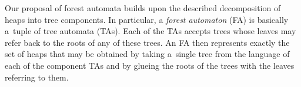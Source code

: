 Our proposal of forest automata builds upon the described decomposition of heaps
into tree components. In particular, a \emph{forest automaton} (FA) is basically
a~tuple of tree automata (TAs). Each of the TAs accepts trees whose
leaves may refer back to the roots of any of these trees. An FA then represents
exactly the set of heaps that may be obtained by taking a~single tree from the
language of each of the component TAs and by glueing the roots of the trees with
the leaves referring to them.



